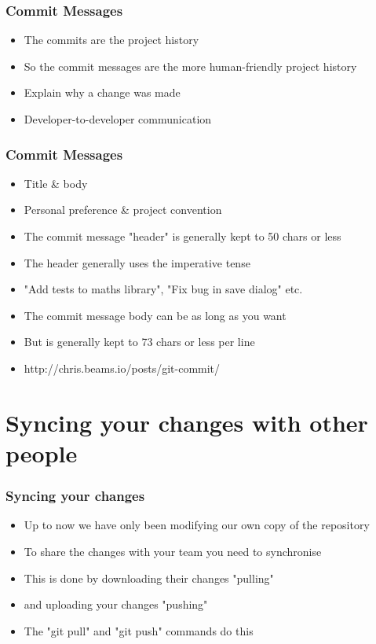 \documentclass{beamer}
\begin{document}
\begin{frame}
\frametitle{Commit Messages}
\begin{itemize}
\item The commits are the project history
\item So the commit messages are the more human-friendly project history
\item Explain why a change was made
\item Developer-to-developer communication
\end{itemize}
\end{frame}

\begin{frame}
\frametitle{Commit Messages}
\begin{itemize}
\item Title \& body
\item Personal preference \& project convention
\item The commit message "header" is generally kept to 50 chars or less
\item The header generally uses the imperative tense
\item "Add tests to maths library", "Fix bug in save dialog" etc.
\item The commit message body can be as long as you want
\item But is generally kept to 73 chars or less per line
\item http://chris.beams.io/posts/git-commit/
\end{itemize}
\begin{figure}
\end{figure}
\end{frame}

\section{Syncing your changes with other people}
\begin{frame}
\frametitle{Syncing your changes}
\begin{itemize}
\item Up to now we have only been modifying our own copy of the repository
\item To share the changes with your team you need to synchronise
\item This is done by downloading their changes "pulling"
\item and uploading your changes "pushing"
\item The "git pull" and "git push" commands do this
\end{itemize}
\end{frame}
\end{document}
